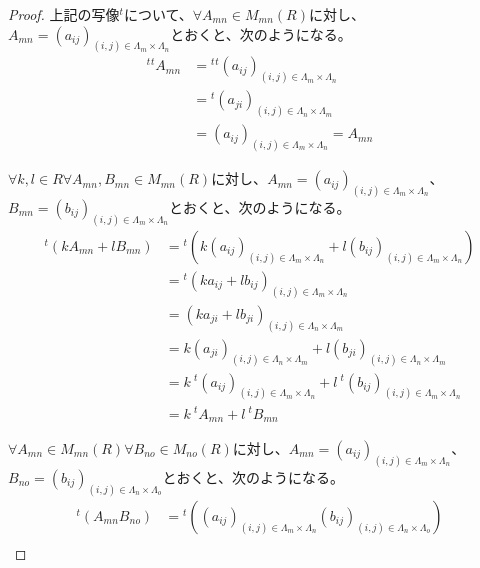 \documentclass[dvipdfmx]{jsarticle}
\begin{document}
\begin{proof}
上記の写像${}^{t}$について、$\forall A_{mn} \in M_{mn}(R)$に対し、$A_{mn} = \left( a_{ij} \right)_{(i,j) \in \varLambda_{m} \times \varLambda_{n}}$とおくと、次のようになる。
\begin{align*}
{}^{t}{}^{t}A_{mn} &={}^{t}{}^{t}\left( a_{ij} \right)_{(i,j) \in \varLambda_{m} \times \varLambda_{n}}\\
&={}^{t}\left( a_{ji} \right)_{(i,j) \in \varLambda_{n} \times \varLambda_{m}}\\
&= \left( a_{ij} \right)_{(i,j) \in \varLambda_{m} \times \varLambda_{n}} = A_{mn}
\end{align*}\par
$\forall k,l \in R\forall A_{mn},B_{mn} \in M_{mn}(R)$に対し、$A_{mn} = \left( a_{ij} \right)_{(i,j) \in \varLambda_{m} \times \varLambda_{n}}$、$B_{mn} = \left( b_{ij} \right)_{(i,j) \in \varLambda_{m} \times \varLambda_{n}}$とおくと、次のようになる。
\begin{align*}
{}^{t}\left( kA_{mn} + lB_{mn} \right) &={}^{t}\left( k\left( a_{ij} \right)_{(i,j) \in \varLambda_{m} \times \varLambda_{n}} + l\left( b_{ij} \right)_{(i,j) \in \varLambda_{m} \times \varLambda_{n}} \right)\\
&={}^{t}\left( ka_{ij} + lb_{ij} \right)_{(i,j) \in \varLambda_{m} \times \varLambda_{n}}\\
&= \left( ka_{ji} + lb_{ji} \right)_{(i,j) \in \varLambda_{n} \times \varLambda_{m}}\\
&= k\left( a_{ji} \right)_{(i,j) \in \varLambda_{n} \times \varLambda_{m}} + l\left( b_{ji} \right)_{(i,j) \in \varLambda_{n} \times \varLambda_{m}}\\
&= k\ {}^{t}\left( a_{ij} \right)_{(i,j) \in \varLambda_{m} \times \varLambda_{n}} + l\ {}^{t}\left( b_{ij} \right)_{(i,j) \in \varLambda_{m} \times \varLambda_{n}}\\
&= k\ {}^{t}A_{mn} + l\ {}^{t}B_{mn}
\end{align*}\par
$\forall A_{mn} \in M_{mn}(R)\forall B_{no} \in M_{no}(R)$に対し、$A_{mn} = \left( a_{ij} \right)_{(i,j) \in \varLambda_{m} \times \varLambda_{n}}$、$B_{no} = \left( b_{ij} \right)_{(i,j) \in \varLambda_{n} \times \varLambda_{o}}$とおくと、次のようになる。
\begin{align*}
{}^{t}\left( A_{mn}B_{no} \right) &={}^{t}\left( \left( a_{ij} \right)_{(i,j) \in \varLambda_{m} \times \varLambda_{n}}\left( b_{ij} \right)_{(i,j) \in \varLambda_{n} \times \varLambda_{o}} \right)\\

\end{align*}
\end{proof}
\end{document}
